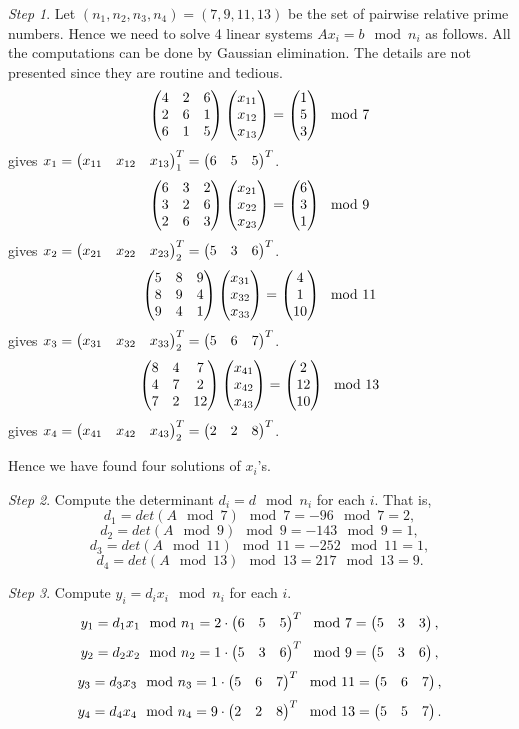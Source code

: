 \documentclass[12pt]{article}
\theoremstyle{plain}
\begin{document}
\emph{Step 1}. Let $(n_1, n_2, n_3, n_4) = (7, 9, 11, 13)$ be the set of pairwise relative prime numbers. Hence we need to solve 4 linear systems $Ax_i = b \mod n_i$ as follows. All the computations can be done by Gaussian elimination. The details are not presented since they are routine and tedious.
$$\begin{pmatrix}4 & 2 & 6 \\
2 & 6 & 1 \\
6 & 1 & 5\end{pmatrix}
\begin{pmatrix}x_{11} \\ x_{12} \\ x_{13}\end{pmatrix}=
\begin{pmatrix}1 \\ 5 \\ 3\end{pmatrix} \mod 7$$
gives $x_1 = \begin{pmatrix}x_{11} & x_{12} & x_{13}\end{pmatrix}_1^T = \begin{pmatrix}6 & 5 & 5\end{pmatrix}^T$.
$$\begin{pmatrix}6 & 3 & 2 \\
3 & 2 & 6 \\
2 & 6 & 3\end{pmatrix}
\begin{pmatrix}x_{21} \\ x_{22} \\ x_{23}\end{pmatrix}=
\begin{pmatrix}6 \\ 3 \\ 1\end{pmatrix} \mod 9$$
gives $x_2 = \begin{pmatrix}x_{21} & x_{22} & x_{23}\end{pmatrix}_2^T = \begin{pmatrix}5 & 3 & 6\end{pmatrix}^T$.
$$\begin{pmatrix}5 & 8 & 9 \\
8 & 9 & 4 \\
9 & 4 & 1\end{pmatrix}
\begin{pmatrix}x_{31} \\ x_{32} \\ x_{33}\end{pmatrix}=
\begin{pmatrix}4 \\ 1 \\ 10\end{pmatrix} \mod 11$$
gives $x_3 = \begin{pmatrix}x_{31} & x_{32} & x_{33}\end{pmatrix}_2^T = \begin{pmatrix}5 & 6 & 7\end{pmatrix}^T$.
$$\begin{pmatrix}8 & 4 & 7 \\
4 & 7 & 2 \\
7 & 2 & 12\end{pmatrix}
\begin{pmatrix}x_{41} \\ x_{42} \\ x_{43}\end{pmatrix}=
\begin{pmatrix}2 \\ 12 \\ 10\end{pmatrix} \mod 13$$
gives $x_4 = \begin{pmatrix}x_{41} & x_{42} & x_{43}\end{pmatrix}_2^T = \begin{pmatrix}2 & 2 & 8\end{pmatrix}^T$.

Hence we have found four solutions of $x_i$'s.

\emph{Step 2}. Compute the determinant $d_i = d \mod n_i$ for each $i$. That is, 
$$d_1 = det(A \mod 7) \mod 7 = -96 \mod 7 = 2,$$
$$d_2 = det(A \mod 9) \mod 9 = -143 \mod 9 = 1,$$ 
$$d_3 = det(A \mod 11) \mod 11 = -252 \mod 11 = 1,$$
$$d_4 = det(A \mod 13) \mod 13 = 217 \mod 13 = 9.$$

\emph{Step 3}. Compute $y_i = d_i x_i \mod n_i$ for each $i$.
$$y_1 = d_1 x_1 \mod n_1 = 2 \cdot \begin{pmatrix}6 & 5 & 5\end{pmatrix}^T \mod 7 = \begin{pmatrix}5 & 3 & 3\end{pmatrix},$$ 
$$y_2 = d_2 x_2 \mod n_2 = 1 \cdot \begin{pmatrix}5 & 3 & 6\end{pmatrix}^T \mod 9 = \begin{pmatrix}5 & 3 & 6\end{pmatrix},$$ 
$$y_3 = d_3 x_3 \mod n_3 = 1 \cdot \begin{pmatrix}5 & 6 & 7\end{pmatrix}^T \mod 11 = \begin{pmatrix}5 & 6 & 7\end{pmatrix},$$ 
$$y_4 = d_4 x_4 \mod n_4 = 9 \cdot \begin{pmatrix}2 & 2 & 8\end{pmatrix}^T \mod 13 = \begin{pmatrix}5 & 5 & 7\end{pmatrix}.$$ 
\end{document}
